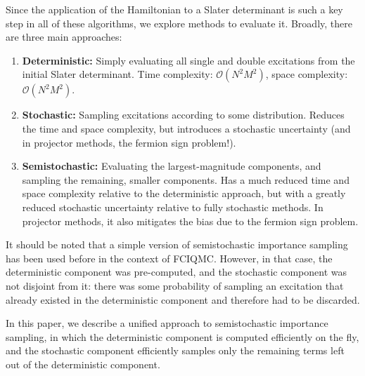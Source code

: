 \documentclass[english]{article}
\begin{document}
Since the application of the Hamiltonian to a Slater determinant is such a key step in all of these algorithms, we explore methods to evaluate it. Broadly, there are three main approaches:
\begin{enumerate}
	\item {\bf Deterministic:} Simply evaluating all single and double excitations from the initial Slater determinant. Time complexity: $\mathcal{O}(N^2 M^2)$, space complexity: $\mathcal{O}(N^2M^2)$.
	\item {\bf Stochastic:} Sampling excitations according to some distribution. Reduces the time and space complexity, but introduces a stochastic uncertainty (and in projector methods, the fermion sign problem!).
	\item {\bf Semistochastic:} Evaluating the largest-magnitude components, and sampling the remaining, smaller components. Has a much reduced time and space complexity relative to the deterministic approach, but with a greatly reduced stochastic uncertainty relative to fully stochastic methods. In projector methods, it also mitigates the bias due to the fermion sign problem.
\end{enumerate}

It should be noted that a simple version of semistochastic importance sampling has been used before in the context of FCIQMC. However, in that case, the deterministic component was pre-computed, and the stochastic component was not disjoint from it: there was some probability of sampling an excitation that already existed in the deterministic component and therefore had to be discarded.

In this paper, we describe a unified approach to semistochastic importance sampling, in which the deterministic component is computed efficiently on the fly, and the stochastic component efficiently samples only the remaining terms left out of the deterministic component.

\section{}
\end{document}
